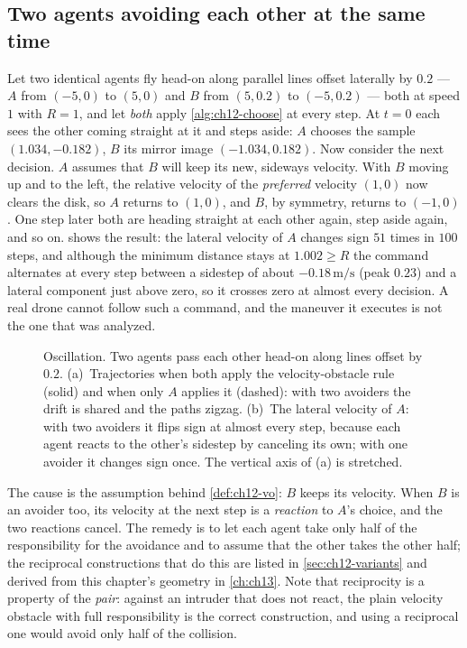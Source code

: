 \subsection{Two agents avoiding each other at the same time}

Let two identical agents fly head-on along parallel lines offset laterally
by $0.2$ --- $A$ from $(-5,0)$ to $(5,0)$ and $B$ from $(5,0.2)$ to
$(-5,0.2)$ --- both at speed $1$ with $R = 1$, and let \emph{both} apply
\cref{alg:ch12-choose} at every step. At $t = 0$ each
sees the other coming straight at it and steps aside: $A$ chooses the sample
$(1.034, -0.182)$, $B$ its mirror image $(-1.034, 0.182)$. Now consider the
next decision. $A$ assumes that $B$ will keep its new, sideways velocity. With
$B$ moving up and to the left, the relative velocity of the \emph{preferred}
velocity $(1,0)$ now clears the disk, so $A$ returns to $(1,0)$, and $B$, by
symmetry, returns to $(-1,0)$. One step later both are heading straight at
each other again, step aside again, and so on. 
shows the result: the lateral velocity of $A$ changes sign $51$ times in
$100$ steps, and although the minimum distance stays at $1.002 \ge R$ the
command alternates at every step between a sidestep of about
$-0.18\,\mathrm{m/s}$ (peak $0.23$) and a lateral component just above zero,
so it crosses zero at almost every decision. A real
drone cannot follow such a command, and the maneuver it executes is not the
one that was analyzed.

\begin{figure}[tb]
  \centering
  \caption{Oscillation. Two agents pass each other head-on along lines
  offset by $0.2$. (a)~Trajectories when both apply the velocity-obstacle rule
  (solid) and when only $A$ applies it (dashed): with two avoiders the drift
  is shared and the paths zigzag. (b)~The lateral velocity of $A$: with two
  avoiders it flips sign at almost every step, because each agent reacts to
  the other's sidestep by canceling its own; with one avoider it changes
  sign once. The vertical axis of (a) is stretched.}
  \label{fig:ch12-oscillation}
\end{figure}

The cause is the assumption behind \cref{def:ch12-vo}: $B$ keeps its velocity.
When $B$ is an avoider too, its velocity at the next step is a \emph{reaction}
to $A$'s choice, and the two reactions cancel. The remedy is to let each agent
take only half of the responsibility for the avoidance and to assume that the
other takes the other half; the reciprocal constructions that do this are
listed in \cref{sec:ch12-variants} and derived from this chapter's geometry in
\cref{ch:ch13}. Note that reciprocity is a property of the \emph{pair}: against
an intruder that does not react, the plain velocity obstacle with full
responsibility is the correct construction, and using a reciprocal one would
avoid only half of the collision.


